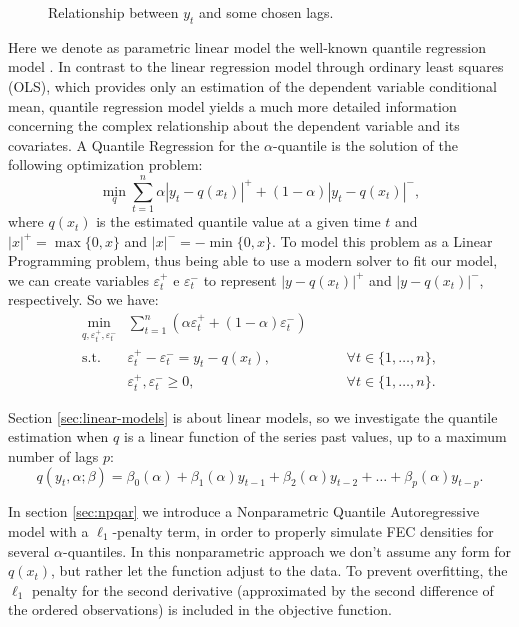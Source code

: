 \begin{figure}
\begin{minipage}[t]{0.45\linewidth}
\begin{minipage}[b]{\linewidth}
    \end{minipage}
  \end{minipage}
  \caption{Relationship between $y_t$ and some chosen lags.}
  \label{lags-icaraizinho}
\end{figure}

Here we denote as parametric linear model the well-known quantile regression model \cite{koenker2005quantile}. In contrast to the linear regression model through ordinary least squares (OLS), which provides only an estimation of the dependent variable conditional mean, quantile regression model yields a much more detailed information concerning the complex relationship about the dependent variable and its covariates. A Quantile Regression for the $\alpha$-quantile is the solution of the following optimization problem:
\begin{equation}
\min_{q}\sum_{t=1}^{n}\alpha|y_{t}-q(x_t)|^{+}+(1-\alpha)|y_{t}-q(x_t)|^{-},
\label{eq:linear-model}
\end{equation}
where $q(x_t)$ is the estimated quantile value at a given time $t$ and $|x|^+=\max\{0,x\}$ and $|x|^-=-\min\{0,x\}$. To model this problem as a Linear Programming problem, thus being able to use a modern solver to fit our model,  we can create variables $\varepsilon^+_t$ e $\varepsilon^-_t$ to represent $|y-q(x_t)|^+$ and $|y-q(x_t)|^-$, respectively. So we have:
\begin{equation}
\begin{aligned}\min_{q,\varepsilon_{t}^{+}, \varepsilon_{t}^{-}} & \sum_{t=1}^{n}\left(\alpha \varepsilon_{t}^{+}+(1-\alpha)\varepsilon_{t}^{-}\right) & \\
\mbox{s.t. } & \varepsilon_{t}^{+}-\varepsilon_{t}^{-}=y_{t}-q(x_{t}), & \qquad\forall t \in \{1,\dots,n\},\\
& \varepsilon_t^+,\varepsilon_t^- \geq 0, & \qquad \forall t \in \{1,\dots,n\}.
\end{aligned}
\label{eq:qar-general}
\end{equation}

Section \ref{sec:linear-models} is about linear models, so we investigate the quantile estimation when $q$ is a linear function of the series past values, up to a maximum number of lags $p$:
\begin{equation}
	q(y_t, \alpha; \beta) = \beta_0(\alpha) + \beta_1(\alpha)y_{t-1} + \beta_2(\alpha)y_{t-2} + \dots + \beta_p(\alpha) y_{t-p}.
	\label{eq:ft-qar}
\end{equation}

In section \ref{sec:npqar} we introduce a Nonparametric Quantile Autoregressive model with a $\ell_{1}$-penalty term, in order to properly simulate FEC densities for several $\alpha$-quantiles. In this nonparametric approach we don't assume any form for $q(x_t)$, but rather let the function adjust to the data. To prevent overfitting, the $\ell_1$ penalty for the second derivative (approximated by the second difference of the ordered observations) is included in the objective function.

